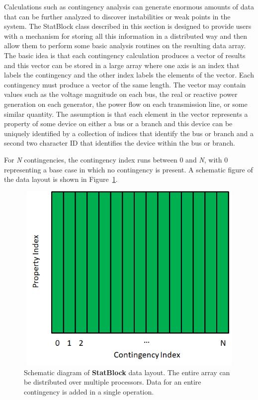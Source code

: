 \documentclass[12pt]{report} %
\begin{document}
Calculations such as contingency analysis can generate enormous amounts of data that can be further analyzed to discover instabilities or weak points in the system. The StatBlock class described in this section is designed to provide users with a mechanism for storing all this information in a distributed way and then allow them to perform some basic analysis routines on the resulting data array. The basic idea is that each contingency calculation produces a vector of results and this vector can be stored in a large array where one axis is an index that labels the contingency and the other index labels the elements of the vector. Each contingency must produce a vector of the same length. The vector may contain values such as the voltage magnitude on each bus, the real or reactive power generation on each generator, the power flow on each transmission line, or some similar quantity. The assumption is that each element in the vector represents a property of some device on either a bus or a branch and this device can be uniquely identified by a collection of indices that identify the bus or branch and a second two character ID that identifies the device within the bus or branch.

For \textit{N} contingencies, the contingency index runs between 0 and \textit{N}, with 0 representing a base case in which no contingency is present. A schematic figure of the data layout is shown in Figure~\ref{fig:fig-13}.

\begin{figure}
  \centering
    \includegraphics*[width=4.81in, height=3.65in, keepaspectratio=true]{Fig13}
  \caption{Schematic diagram of \textbf{StatBlock} data layout. The entire array can be distributed over multiple processors. Data for an entire contingency is added in a single operation.}
  \label{fig:fig-13}
\end{figure}
\end{document}
